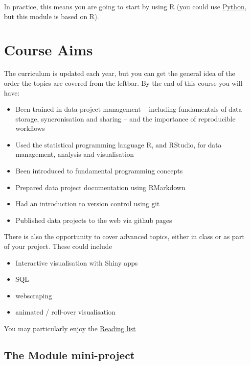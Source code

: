 \documentclass[
]{book}
\providecommand{\tightlist}{%
  \setlength{\itemsep}{0pt}\setlength{\parskip}{0pt}}
\begin{document}
In practice, this means you are going to start by using R (you could use \href{https://tomstafford.github.io/psy6422/appendices.html\#python}{Python}, but this module is based on R).

\hypertarget{course-aims}{%
\section{Course Aims}\label{course-aims}}

The curriculum is updated each year, but you can get the general idea of the order the topics are covered from the leftbar. By the end of this course you will have:

\begin{itemize}
\tightlist
\item
  Been trained in data project management -- including fundamentals of data storage, syncronisation and sharing -- and the importance of reproducible workflows
\item
  Used the statistical programming language R, and RStudio, for data management, analysis and visualisation
\item
  Been introduced to fundamental programming concepts
\item
  Prepared data project documentation using RMarkdown
\item
  Had an introduction to version control using git
\item
  Published data projects to the web via github pages
\end{itemize}

There is also the opportunity to cover advanced topics, either in class or as part of your project. These could include

\begin{itemize}
\tightlist
\item
  Interactive visualisation with Shiny apps
\item
  SQL
\item
  webscraping
\item
  animated / roll-over visualisation
\end{itemize}

You may particularly enjoy the \href{extra-reading.html}{Reading list}

\hypertarget{the-module-mini-project}{%
\subsection{The Module mini-project}\label{the-module-mini-project}}
\end{document}
